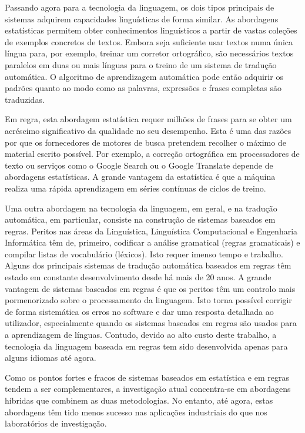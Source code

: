 \begin{multicols}{2}

Passando agora para a tecnologia da linguagem, os dois tipos principais de sistemas adquirem capacidades linguísticas de forma similar. As abordagens estatísticas permitem obter co\-nhe\-ci\-men\-tos linguísticos a partir de vastas coleções de exemplos concretos de textos. Embora seja suficiente usar textos numa única língua para, por exemplo, treinar um corretor ortográfico, são necessários textos paralelos em duas ou mais línguas para o treino de um sistema de tradução automática. O algoritmo de aprendizagem automática pode então adquirir os padrões quanto ao modo como as palavras, expressões e frases completas são traduzidas.

Em regra, esta abordagem estatística requer milhões de frases para se obter um acréscimo significativo da qualidade no seu desempenho. 
Esta é uma das razões por que os fornecedores de motores de busca pretendem recolher o máximo de material escrito possível. Por exemplo, a correção ortográfica em processadores de texto ou serviços como o Google Search ou o Google Translate depende de abordagens estatísticas. A grande vantagem da estatística é que a máquina realiza uma rápida aprendizagem em séries contínuas de ciclos de treino.

Uma outra abordagem na tecnologia da linguagem, em geral, e na tradução automática, em particular, consiste na construção de sistemas baseados em regras. Peritos nas áreas da Linguística, Linguística Computacional e Engenharia Informática têm de, primeiro, codificar a análise gramatical (regras gramaticais) e compilar listas de vocabulário (léxicos). Isto requer imenso tempo e trabalho. Alguns dos principais sistemas de tradução automática baseados em regras têm estado em constante desenvolvimento desde há mais de 20 anos. A grande vantagem de sistemas baseados em regras é que os peritos têm um controlo mais pormenorizado sobre o processamento da linguagem. Isto torna possível corrigir de forma sistemática os erros no software e dar uma resposta detalhada ao utilizador, especialmente quando os sistemas baseados em regras são usados para a aprendizagem de línguas. Contudo, devido ao alto custo deste trabalho, a tecnologia da linguagem baseada em regras tem sido desenvolvida apenas para alguns idiomas até agora.

Como os pontos fortes e fracos de sistemas baseados em estatística e em regras tendem a ser complementares, a investigação atual concentra-se em abordagens híbridas que combinem as duas metodologias. No entanto, até agora, estas abordagens têm tido menos sucesso nas aplicações industriais do que nos laboratórios de investigação. 


\end{multicols}
